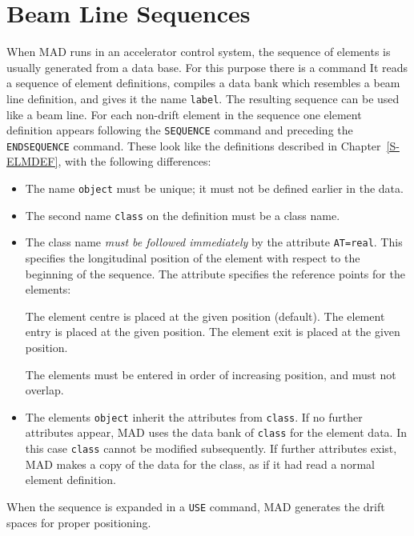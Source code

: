 \section{Beam Line Sequences}
\label{S-SEQ}
When MAD runs in an accelerator control system,
the sequence of elements is usually generated from a data base.
For this purpose there is a command
It reads a sequence of element definitions,
compiles a data bank which resembles a beam line definition,
and gives it the name {\tt label}.
The resulting sequence can be used like a beam line.
For each non-drift element in the sequence one element definition appears
following the {\tt SEQUENCE} command
and preceding the {\tt ENDSEQUENCE} command.
These look like the definitions described
in Chapter~\ref{S-ELMDEF}, with the following differences:
\begin{itemize}
\item The name {\tt object} must be unique;
it must not be defined earlier in the data.
\item The second name {\tt class} on the definition must be a class name.
\item The class name {\em must be followed immediately} by the attribute
{\tt AT=real}.
This specifies the longitudinal position of the
element with respect to the beginning of the sequence.
The attribute  specifies the reference points for the
elements:
\begin{mylist}
The element centre is placed at the given position (default).
The element entry is placed at the given position.
The element exit is placed at the given position.
\end{mylist}
The elements must be entered in order of increasing position,
and must not overlap.
\item The elements {\tt object} inherit the attributes from {\tt class}.
If no further attributes appear, MAD uses the data bank of {\tt class}
for the element data.
In this case {\tt class} cannot be modified subsequently.
If further attributes exist,
MAD makes a copy of the data for the class,
as if it had read a normal element definition.
\end{itemize}
When the sequence is expanded in a {\tt USE} command,
MAD generates the drift spaces for proper positioning.
 
